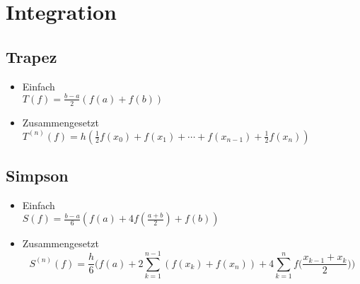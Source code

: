 \section{Integration}

\subsection{Trapez}
\begin{itemize}
	\item Einfach \\
	$T(f) = \frac{b-a}{2} (f(a) + f(b))$
	
	\item Zusammengesetzt \\
	$T^{(n)}(f) = h (\frac{1}{2} f(x_0) + f(x_1) + \cdots + f(x_{n-1}) + \frac{1}{2} f(x_n))$
\end{itemize}

\subsection{Simpson}
\begin{itemize}
	\item Einfach \\
	$S(f) = \frac{b-a}{6} (f(a) + 4 f(\frac{a+b}{2}) + f(b))$
	
	\item Zusammengesetzt \\
	\begin{equation*}
		S^{(n)}(f) = \frac{h}{6} \bigg(f(a) + 2 \sum_{k=1}^{n-1}(f(x_k)+f(x_n)) + 4 \sum_{k=1}^nf\big(\frac{x_{k-1}+x_k}{2}\big)\bigg)
	\end{equation*}
\end{itemize}

